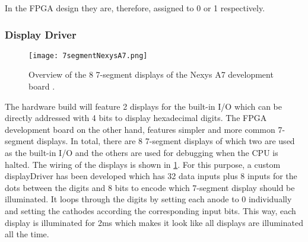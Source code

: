 In the \gls{FPGA} design they are, therefore, assigned to 0 or 1 respectively.

\subsubsection{Display Driver}
\begin{figure}
  \centering
  \texttt{[image: 7segmentNexysA7.png]}
  \caption{Overview of the 8 7-segment displays of the Nexys A7 development board \cite{7segNexys}.}
  \label{fig:7segNexys}
\end{figure}
The hardware build will feature 2 displays for the built-in I/O which can be directly addressed with 4 bits to display hexadecimal digits.
The \gls{FPGA} development board on the other hand, features simpler and more common 7-segment displays.
In total, there are 8 7-segment displays of which two are used as the built-in I/O and the others are used for debugging when the \gls{CPU} is halted.
The wiring of the displays is shown in \cref{fig:7segNexys}.
For this purpose, a custom displayDriver has been developed which has 32 data inputs plus 8 inputs for the dots between the digits and 8 bits to encode which 7-segment display should be illuminated.
It loops through the digits by setting each anode to 0 individually and setting the cathodes according the corresponding input bits.
This way, each display is illuminated for 2ms which makes it look like all displays are illuminated all the time.

